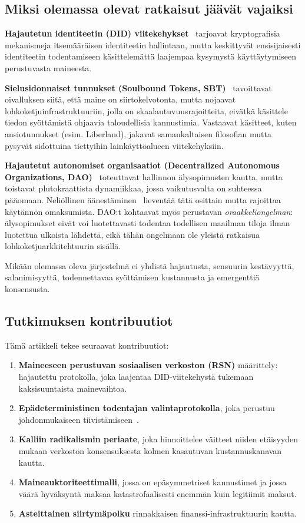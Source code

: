\documentclass[11pt,a4paper,twocolumn]{article}
\begin{document}
\subsection{Miksi olemassa olevat ratkaisut jäävät vajaiksi}

\textbf{Hajautetun identiteetin (DID) viitekehykset}~\cite{did2022} tarjoavat kryptografisia mekanismeja itsemääräisen identiteetin hallintaan, mutta keskittyvät ensisijaisesti identiteetin todentamiseen käsittelemättä laajempaa kysymystä käyttäytymiseen perustuvasta maineesta.

\textbf{Sielusidonnaiset tunnukset (Soulbound Tokens, SBT)}~\cite{weyl2022} tavoittavat oivalluksen siitä, että maine on siirtokelvotonta, mutta nojaavat lohkoketjuinfrastruktuuriin, jolla on skaalautuvuusrajoitteita, eivätkä käsittele tiedon syöttämistä ohjaavia taloudellisia kannustimia. Vastaavat käsitteet, kuten ansiotunnukset (esim. Liberland), jakavat samankaltaisen filosofian mutta pysyvät sidottuina tiettyihin lainkäyttöalueen viitekehyksiin.

\textbf{Hajautetut autonomiset organisaatiot (Decentralized Autonomous Organizations, DAO)}~\cite{buterin2014} toteuttavat hallinnon älysopimusten kautta, mutta toistavat plutokraattista dynamiikkaa, jossa vaikutusvalta on suhteessa pääomaan. Neliöllinen äänestäminen~\cite{buterin2019} lieventää tätä osittain mutta rajoittaa käytännön omaksumista. DAO:t kohtaavat myös perustavan \emph{oraakkeliongelman}: älysopimukset eivät voi luotettavasti todentaa todellisen maailman tiloja ilman luotettua ulkoista lähdettä, eikä tähän ongelmaan ole yleistä ratkaisua lohkoketjuarkkitehtuurin sisällä.

Mikään olemassa oleva järjestelmä ei yhdistä hajautusta, sensuurin kestävyyttä, salanimisyyttä, todennettavaa syöttämisen kustannusta ja emergenttiä konsensusta.

\subsection{Tutkimuksen kontribuutiot}

Tämä artikkeli tekee seuraavat kontribuutiot:
\begin{enumerate}[nosep]
\item \textbf{Maineeseen perustuvan sosiaalisen verkoston (RSN)} määrittely: hajautettu protokolla, joka laajentaa DID-viitekehystä tukemaan kaksisuuntaista mainevaihtoa.
\item \textbf{Epädeterministinen todentajan valintaprotokolla}, joka perustuu johdonmukaiseen tiivistämiseen~\cite{karger1997}.
\item \textbf{Kalliin radikalismin periaate}, joka hinnoittelee väitteet niiden etäisyyden mukaan verkoston konsensuksesta kolmen kasautuvan kustannuskanavan kautta.
\item \textbf{Maineauktoriteettimalli}, jossa on epäsymmetriset kannustimet ja jossa väärä hyväksyntä maksaa katastrofaalisesti enemmän kuin legitiimit maksut.
\item \textbf{Asteittainen siirtymäpolku} rinnakkaisen finanssi-infrastruktuurin kautta.
\end{enumerate}
\end{document}
